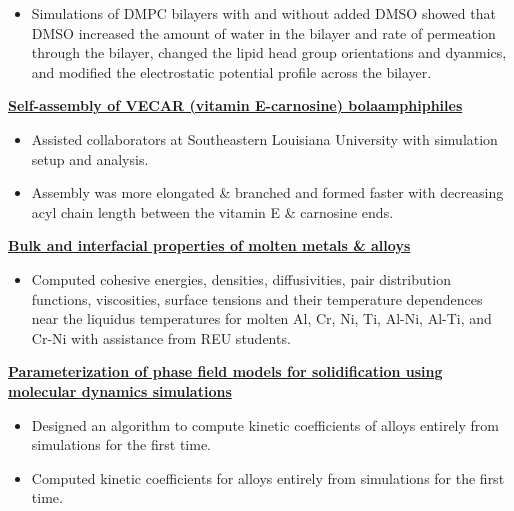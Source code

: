 \begin{cventries}
{\begin{cvitems}
                \vspace{2pt}
                \begin{itemize}
                    \item Simulations of DMPC bilayers with and without added DMSO showed that DMSO increased the amount of water in the bilayer and rate of permeation through the bilayer, changed the lipid head group orientations and dyanmics, and modified the electrostatic potential profile across the bilayer.
                \end{itemize}
            \item {\textbf{\underline{Self-assembly of VECAR (vitamin E-carnosine) bolaamphiphiles}}}
                \vspace{2pt}
                \begin{itemize}
                \item {Assisted collaborators at Southeastern Louisiana University with simulation setup and analysis.}
                \item{Assembly was more elongated \& branched and formed faster with decreasing acyl chain length between the vitamin E \& carnosine ends.}
                \end{itemize}
            \item {\textbf{\underline{Bulk and interfacial properties of molten metals \& alloys}}}
                \vspace{2pt}
                \begin{itemize}
                    \item Computed cohesive energies, densities, diffusivities, pair distribution functions, viscosities, surface tensions and their temperature dependences near the liquidus temperatures for molten Al, Cr, Ni, Ti, Al-Ni, Al-Ti, and Cr-Ni with assistance from REU students.
                \end{itemize}
            \item {\textbf{\underline{Parameterization of phase field models for solidification using molecular dynamics simulations}}}
                \vspace{2pt}
                \begin{itemize}
                    \item {Designed an algorithm to compute kinetic coefficients of alloys entirely from simulations for the first time.}
                    \item {Computed kinetic coefficients for alloys entirely from simulations for the first time.}

\end{itemize}
\end{cvitems}}
\end{cventries}
